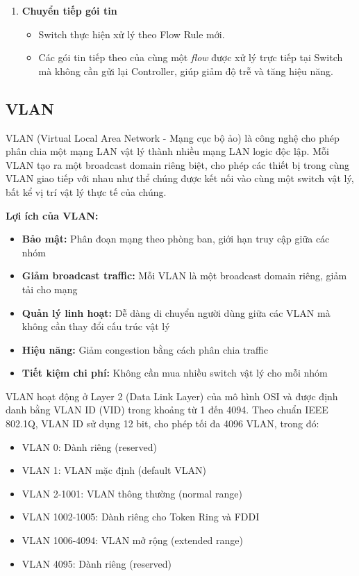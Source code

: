 \begin{enumerate}
    \item \textbf{Chuyển tiếp gói tin}
    \begin{itemize}
        \item Switch thực hiện xử lý theo Flow Rule mới.
        \item Các gói tin tiếp theo của cùng một \textit{flow} được xử lý trực tiếp tại Switch mà không cần gửi lại Controller, giúp giảm độ trễ và tăng hiệu năng.
    \end{itemize}
\end{enumerate}

\subsection{VLAN}

VLAN (Virtual Local Area Network - Mạng cục bộ ảo) là công nghệ cho phép phân chia một mạng LAN vật lý thành nhiều mạng LAN logic độc lập. Mỗi VLAN tạo ra một broadcast domain riêng biệt, cho phép các thiết bị trong cùng VLAN giao tiếp với nhau như thể chúng được kết nối vào cùng một switch vật lý, bất kể vị trí vật lý thực tế của chúng.

\textbf{Lợi ích của VLAN:}
\begin{itemize}
    \item \textbf{Bảo mật:} Phân đoạn mạng theo phòng ban, giới hạn truy cập giữa các nhóm
    \item \textbf{Giảm broadcast traffic:} Mỗi VLAN là một broadcast domain riêng, giảm tải cho mạng
    \item \textbf{Quản lý linh hoạt:} Dễ dàng di chuyển người dùng giữa các VLAN mà không cần thay đổi cấu trúc vật lý
    \item \textbf{Hiệu năng:} Giảm congestion bằng cách phân chia traffic
    \item \textbf{Tiết kiệm chi phí:} Không cần mua nhiều switch vật lý cho mỗi nhóm
\end{itemize}

VLAN hoạt động ở Layer 2 (Data Link Layer) của mô hình OSI và được định danh bằng VLAN ID (VID) trong khoảng từ 1 đến 4094. Theo chuẩn IEEE 802.1Q, VLAN ID sử dụng 12 bit, cho phép tối đa 4096 VLAN, trong đó:
\begin{itemize}
    \item VLAN 0: Dành riêng (reserved)
    \item VLAN 1: VLAN mặc định (default VLAN)
    \item VLAN 2-1001: VLAN thông thường (normal range)
    \item VLAN 1002-1005: Dành riêng cho Token Ring và FDDI
    \item VLAN 1006-4094: VLAN mở rộng (extended range)
    \item VLAN 4095: Dành riêng (reserved)
\end{itemize}

